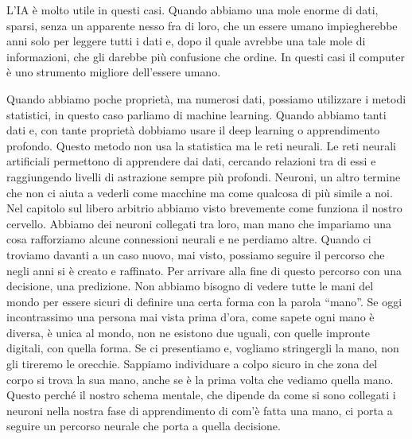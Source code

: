 \documentclass[12pt]{book} %
\begin{document}
L'IA è molto utile in questi casi. Quando abbiamo una mole enorme di dati, sparsi, senza un
apparente nesso fra di loro, che un essere umano impiegherebbe anni solo per leggere tutti i dati e, dopo il quale
avrebbe una tale mole di informazioni, che gli darebbe più confusione che ordine. In questi casi il computer è uno
strumento migliore dell'essere umano.

Quando abbiamo poche proprietà, ma numerosi dati, possiamo utilizzare i metodi statistici, in questo caso parliamo di
machine learning. Quando abbiamo tanti dati e, con tante proprietà dobbiamo usare il deep learning o apprendimento
profondo. Questo metodo non usa la statistica ma le reti neurali. Le reti neurali artificiali permettono di apprendere
dai dati, cercando relazioni tra di essi e raggiungendo livelli di astrazione sempre più profondi. Neuroni, un altro
termine che non ci aiuta a vederli come macchine ma come qualcosa di più simile a noi. Nel capitolo sul libero arbitrio
abbiamo visto brevemente come funziona il nostro cervello. Abbiamo dei neuroni collegati tra loro, man mano che
impariamo una cosa rafforziamo alcune connessioni neurali e ne perdiamo altre. Quando ci troviamo davanti a un caso
nuovo, mai visto, possiamo seguire il percorso che negli anni si è creato e raffinato. Per arrivare alla fine di questo
percorso con una decisione, una predizione. Non abbiamo bisogno di vedere tutte le mani del mondo per essere sicuri di
definire una certa forma con la parola “mano”. Se oggi incontrassimo una persona mai vista prima
d'ora, come sapete ogni mano è diversa, è unica al mondo, non ne esistono due uguali, con quelle
impronte digitali, con quella forma. Se ci presentiamo e, vogliamo stringergli la mano, non gli tireremo le orecchie.
Sappiamo individuare a colpo sicuro in che zona del corpo si trova la sua mano, anche se è la prima volta che vediamo
quella mano. Questo perché il nostro schema mentale, che dipende da come si sono collegati i neuroni nella nostra fase
di apprendimento di com'è fatta una mano, ci porta a seguire un percorso neurale che porta a
quella decisione.
\end{document}
